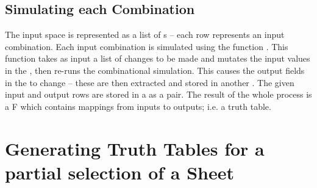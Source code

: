 \subsection{Simulating each Combination}
The input space is represented as a list of s -- each row represents an input combination. Each input combination is simulated using the function . This function takes as input a list of changes to be made and mutates the input values in the , then re-runs the combinational simulation. This causes the output fields in the  to change -- these are then extracted and stored in another . The given input and output rows are stored in a  as a pair. The result of the whole process is a F\fsharp {} which contains mappings from inputs to outputs; i.e. a truth table. 



\section{Generating Truth Tables for a partial selection of a Sheet} \label{sec:selTTGen}


